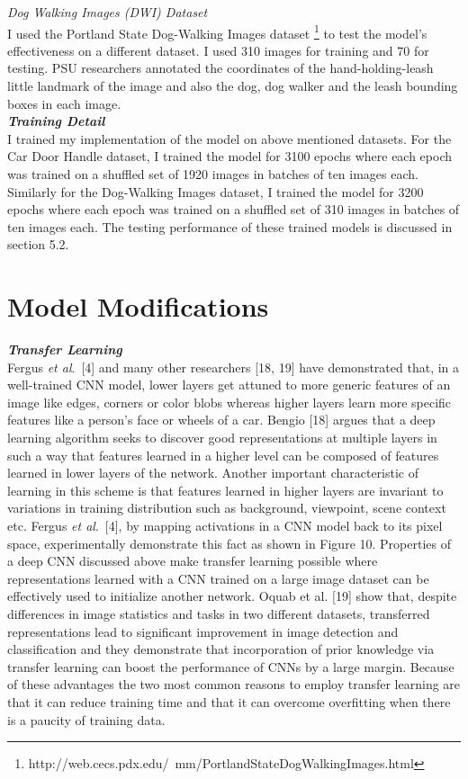 \documentclass [11pt,letterpaper ,twoside ,openany ]{report}
\begin{document}
    \noindent
    \textit{Dog Walking Images (DWI) Dataset}\\
    I used the Portland State Dog-Walking Images dataset \footnote {http://web.cecs.pdx.edu/~mm/PortlandStateDogWalkingImages.html} to test the model's effectiveness on a different dataset. I used 310 images for training and 70 for testing. PSU researchers annotated the coordinates of the hand-holding-leash little landmark of the image and also the dog, dog walker and the leash bounding boxes in each image.\\

    \noindent
    \textbf{\textit{Training Detail}}\\
    I trained my implementation of the model on above mentioned datasets. For the Car Door Handle dataset, I trained the model for 3100 epochs where each epoch was trained on a shuffled set of 1920 images in batches of ten images each. Similarly for the Dog-Walking Images dataset, I trained the model for 3200 epochs where each epoch was trained on a shuffled set of 310 images in batches of ten images each. The testing performance of these trained models is discussed in section 5.2.

    \section{Model Modifications}

    \noindent
    \textbf{\textit{Transfer Learning}}\\
    Fergus \textit {et al}.\ [4] and many other researchers [18, 19] have demonstrated that, in a well-trained CNN model, lower layers get attuned to more generic features of an image like edges, corners or color blobs whereas higher layers learn more specific features like a person's face or wheels of a car. Bengio [18] argues that a deep learning algorithm seeks to discover good representations at multiple layers  in such a way that features learned in a higher level can be composed of features learned in lower layers of the network. Another important characteristic of learning in this scheme is that features learned in higher layers are invariant to variations in training distribution such as background, viewpoint, scene context etc. Fergus \textit{et al}.\ [4], by mapping activations in a CNN model back to its pixel space, experimentally demonstrate this fact as shown in Figure 10. Properties of a deep CNN discussed above make transfer learning possible where representations learned with a CNN trained on a large image dataset can be effectively used to  initialize another network. Oquab et al. [19] show that, despite differences in image statistics and tasks in two different datasets, transferred representations lead to significant improvement in image detection and classification and they demonstrate that incorporation of prior knowledge via transfer learning can boost the performance of CNNs by a large margin. Because of these advantages the two most common reasons to employ transfer learning are that it can reduce training time and that it can overcome overfitting when there is a paucity of training data.
\end{document}
